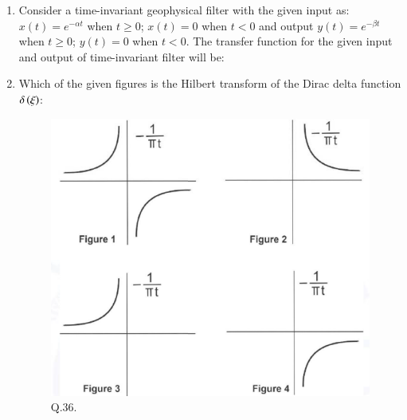 \documentclass[journal,12pt,onecolumn]{IEEEtran}
\theoremstyle{remark}
\begin{document}
\begin{enumerate}
    \item Consider a time-invariant geophysical filter with the given input as: $x(t) = e^{-\alpha t}$ when $t \ge 0$; $x(t) = 0$ when $t < 0$ and output $y(t) = e^{-\beta t}$ when $t \ge 0$; $y(t) = 0$ when $t < 0$. The transfer function for the given input and output of time-invariant filter will be: \hfill{}
        \begin{enumerate}
        \end{enumerate}
    
    \item Which of the given figures is the Hilbert transform of the Dirac delta function $\delta\left(\xi\right)$: \hfill{}
        \begin{figure}[h]
            \centering
            \includegraphics[width=0.5\columnwidth]{Figs/fig_4.png}
            \caption{Q.36.}
            \label{fig:q.36}
        \end{figure}
    
        \begin{enumerate}
        \end{enumerate}
    

\end{enumerate}
\end{document}
